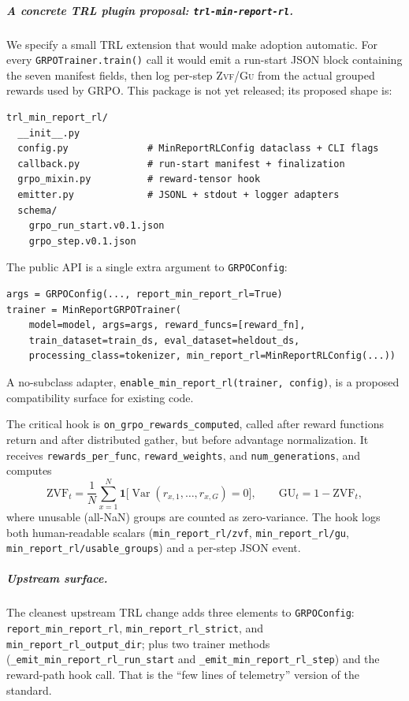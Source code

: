 \documentclass[11pt]{article}
\newcommand{\zvf}{\textsc{Zvf}}
\newcommand{\gu}{\textsc{Gu}}
\begin{document}
\subparagraph{A concrete TRL plugin proposal: \texttt{trl-min-report-rl}.}
We specify a small TRL extension that would make adoption automatic. For every
\texttt{GRPOTrainer.train()} call it would emit a run-start JSON block
containing the seven manifest fields, then log per-step \zvf{}/\gu{} from the
actual grouped rewards used by GRPO. This package is not yet released; its
proposed shape is:
\begin{verbatim}
trl_min_report_rl/
  __init__.py
  config.py              # MinReportRLConfig dataclass + CLI flags
  callback.py            # run-start manifest + finalization
  grpo_mixin.py          # reward-tensor hook
  emitter.py             # JSONL + stdout + logger adapters
  schema/
    grpo_run_start.v0.1.json
    grpo_step.v0.1.json
\end{verbatim}
The public API is a single extra argument to \texttt{GRPOConfig}:
\begin{verbatim}
args = GRPOConfig(..., report_min_report_rl=True)
trainer = MinReportGRPOTrainer(
    model=model, args=args, reward_funcs=[reward_fn],
    train_dataset=train_ds, eval_dataset=heldout_ds,
    processing_class=tokenizer, min_report_rl=MinReportRLConfig(...))
\end{verbatim}
A no-subclass adapter, \texttt{enable\_min\_report\_rl(trainer, config)}, is a
proposed compatibility surface for existing code.

The critical hook is \texttt{on\_grpo\_rewards\_computed}, called after reward
functions return and after distributed gather, but before advantage
normalization. It receives \texttt{rewards\_per\_func}, \texttt{reward\_weights},
and \texttt{num\_generations}, and computes
\[
\text{ZVF}_t = \frac{1}{N}\sum_{x=1}^{N}
  \mathbf{1}\big[\operatorname{Var}(r_{x,1},\dots,r_{x,G})=0\big],
\qquad
\text{GU}_t = 1 - \text{ZVF}_t,
\]
where unusable (all-NaN) groups are counted as zero-variance. The hook logs both
human-readable scalars (\texttt{min\_report\_rl/zvf},
\texttt{min\_report\_rl/gu}, \texttt{min\_report\_rl/usable\_groups}) and a
per-step JSON event.

\subparagraph{Upstream surface.}
The cleanest upstream TRL change adds three elements to \texttt{GRPOConfig}:
\texttt{report\_min\_report\_rl}, \texttt{min\_report\_rl\_strict}, and
\texttt{min\_report\_rl\_output\_dir}; plus two trainer methods
(\texttt{\_emit\_min\_report\_rl\_run\_start} and
\texttt{\_emit\_min\_report\_rl\_step}) and the reward-path hook call. That
is the ``few lines of telemetry'' version of the standard.
\end{document}

